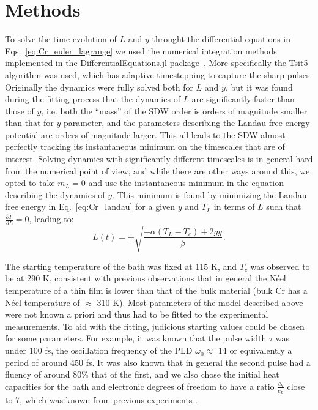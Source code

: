 \section{Methods}
To solve the time evolution of $L$ and $y$ throught the differential equations in Eqs.~\ref{eq:Cr_euler_lagrange} we used the numerical integration methods implemented in the \href{https://github.com/SciML/DifferentialEquations.jl}{DifferentialEquations.jl} package~\cite{rackauckas2017differentialequations}. More specifically the Tsit5 algorithm was used, which has adaptive timestepping to capture the sharp pulses.
Originally the dynamics were fully solved both for $L$ and $y$, but it was found during the fitting process that the dynamics of $L$ are significantly faster than those of $y$, i.e. both the ``mass'' of the SDW order is orders of magnitude smaller than that for $y$ parameter, and the parameters describing the Landau free energy potential are orders of magnitude larger. This all leads to the SDW almost perfectly tracking its instantaneous minimum on the timescales that are of interest.
Solving dynamics with significantly different timescales is in general hard from the numerical point of view, and while there are other ways around this, we opted to take $m_L = 0$ and use the instantaneous minimum in the equation describing the dynamics of $y$.
This minimum is found by minimizing the Landau free energy in Eq.~\ref{eq:Cr_landau} for a given $y$ and $T_L$ in terms of $L$ such that $\frac{\partial F}{\partial L} = 0$, leading to:
\begin{equation}
	L(t) = \pm \sqrt{\frac{- \alpha (T_L - T_c) + 2 g y}{\beta}}.
\end{equation}

The starting temperature of the bath was fixed at 115 K, and $T_c$ was observed to be at 290 K, consistent with previous observations that in general the N\'eel temperature of a thin film is lower than that of the bulk material (bulk Cr has a N\'eel temperature of $\approx$ 310 K).
Most parameters of the model described above were not known a priori and thus had to be fitted to the experimental measurements. To aid with the fitting, judicious starting values could be chosen for some parameters. For example, it was known that the pulse width $\tau$ was under 100 fs, the oscillation frequency of the PLD $\omega_0 \approx$ 14 or equivalently a period of around 450 fs. It was also known that in general the second pulse had a fluency of around 80\% that of the first, and we also chose the initial heat capacities for the bath and electronic degrees of freedom to have a ratio $\frac{c_b}{c_L}$ close to 7, which was known from previous experiments .

